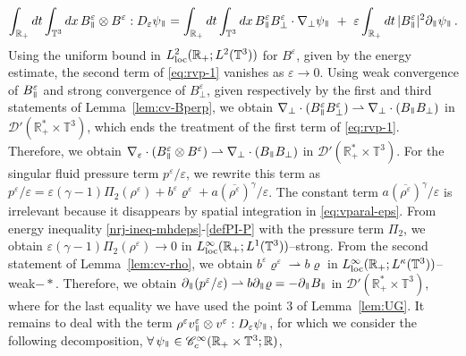 \documentclass[11pt,reqno]{amsart}
\def \R{{\mathbb{R}}}
\def \T{{\mathbb{T}}}
\newcommand{\myparallel}{{\mkern3mu\vphantom{\perp}\vrule depth 0pt\mkern2mu\vrule depth 0pt\mkern3mu}}
\begin{document}
\begin{equation}
  \label{eq:rvp-1}
  \int_{\R_+}  dt \int_{\T^3}dx \, B_\myparallel^\varepsilon  \otimes B^\varepsilon : D_\varepsilon\psi_\myparallel
  = \int_{\R_+}  dt \int_{\T^3}dx \, B_\myparallel^\varepsilon  B_\perp^\varepsilon \cdot\nabla_\perp \psi_\myparallel
  \ + \  \varepsilon\int_{\R_+}  dt\,  |B_\myparallel^\varepsilon|^2 \partial_\myparallel\psi_\myparallel\,.
\end{equation}  
Using the uniform bound in $L_{\rm loc}^2(\R_+;L^2(\T^3))$ for  $B^\varepsilon$, given by the energy estimate, the second term of \eqref{eq:rvp-1} vanishes as $\varepsilon \rightarrow 0$. Using weak convergence of  $B_\myparallel^\varepsilon$ and strong convergence of $B_\perp^\varepsilon $, given respectively by the first and third statements of Lemma~\ref{lem:cv-Bperp}, we obtain $\nabla_\perp \cdot (B_\myparallel^\varepsilon B_\perp^\varepsilon) \rightharpoonup \nabla_\perp \cdot (B_\myparallel B_\perp)$ in  $\mathcal D'(\R_+^* \times \T^3)$, which ends the treatment of the first term of \eqref{eq:rvp-1}. Therefore, we obtain $\nabla_\varepsilon \cdot (B_\myparallel^\varepsilon \otimes B^\varepsilon) \rightharpoonup \nabla_\perp \cdot (B_\myparallel B_\perp)$ in  $\mathcal D'(\R_+^* \times \T^3)$. For the singular fluid pressure term  $  p^\varepsilon /\varepsilon$, we rewrite this term as $ p^\varepsilon /\varepsilon= \varepsilon (\gamma-1)\Pi_2(\rho^\varepsilon) + b^\varepsilon\varrho^\varepsilon + a (\overline{\rho^\varepsilon})^\gamma/\varepsilon$. The constant term $ a (\overline{\rho^\varepsilon})^\gamma/\varepsilon$ is irrelevant because it disappears by spatial integration in \eqref{eq:vparal-eps}. From energy inequality \eqref{nrj-ineq-mhdeps}-\eqref{defPI-P} with the pressure term $\Pi_2$, we obtain $\varepsilon (\gamma-1)\Pi_2(\rho^\varepsilon) \rightarrow 0$ in  $L_{\rm loc}^\infty(\R_+;L^1(\T^3))$--strong. From the second statement of Lemma~\ref{lem:cv-rho}, we obtain $ b^\varepsilon\varrho^\varepsilon \rightharpoonup b \varrho$ in $L_{\rm loc}^\infty(\R_+;L^\kappa(\T^3))$--weak$-*$. Therefore, we obtain $\partial_\myparallel ( p^\varepsilon /\varepsilon) \rightharpoonup b \partial_\myparallel\varrho=-\partial_\myparallel B_\myparallel$ in $\mathcal D'(\R_+^* \times \T^3)$, where for the last equality we have used the point 3 of Lemma~\ref{lem:UG}. It remains to deal with the term $\rho^\varepsilon v_\myparallel^\varepsilon \otimes v^\varepsilon : D_\varepsilon\psi_\myparallel$, for which we consider the following decomposition, $\forall \,\psi_\myparallel \in \mathscr{C}_c^\infty(\R_+\times \T^3;\R)$, 
\end{document}
